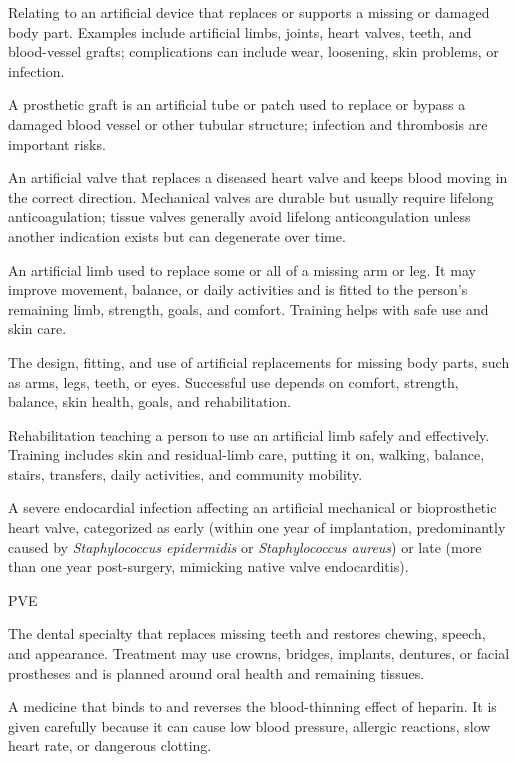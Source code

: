  Relating to an artificial device that replaces or supports a missing or damaged body part. Examples include artificial limbs, joints, heart valves, teeth, and blood-vessel grafts; complications can include wear, loosening, skin problems, or infection.

 A prosthetic graft is an artificial tube or patch used to replace or bypass a damaged blood vessel or other tubular structure; infection and thrombosis are important risks.

 An artificial valve that replaces a diseased heart valve and keeps blood moving in the correct direction. Mechanical valves are durable but usually require lifelong anticoagulation; tissue valves generally avoid lifelong anticoagulation unless another indication exists but can degenerate over time.

 An artificial limb used to replace some or all of a missing arm or leg. It may improve movement, balance, or daily activities and is fitted to the person’s remaining limb, strength, goals, and comfort. Training helps with safe use and skin care.

 The design, fitting, and use of artificial replacements for missing body parts, such as arms, legs, teeth, or eyes. Successful use depends on comfort, strength, balance, skin health, goals, and rehabilitation.

 Rehabilitation teaching a person to use an artificial limb safely and effectively. Training includes skin and residual-limb care, putting it on, walking, balance, stairs, transfers, daily activities, and community mobility.

 A severe endocardial infection affecting an artificial mechanical or bioprosthetic heart valve, categorized as early (within one year of implantation, predominantly caused by \textit{Staphylococcus epidermidis} or \textit{Staphylococcus aureus}) or late (more than one year post-surgery, mimicking native valve endocarditis).

\synonyms
PVE

 The dental specialty that replaces missing teeth and restores chewing, speech, and appearance. Treatment may use crowns, bridges, implants, dentures, or facial prostheses and is planned around oral health and remaining tissues.

 A medicine that binds to and reverses the blood-thinning effect of heparin. It is given carefully because it can cause low blood pressure, allergic reactions, slow heart rate, or dangerous clotting.

